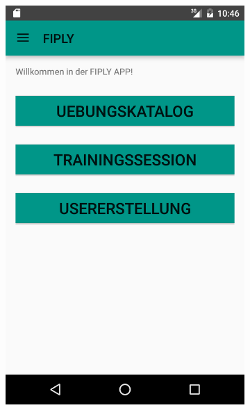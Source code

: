 \documentclass[FIPLY_base.tex]{subfiles}
\begin{document}
\begin{figure}[t]
\begin{subfigure}[h]{0.3\textwidth}
	\end{subfigure}
	\hfil
	\begin{subfigure}[h]{0.3\textwidth}
	\includegraphics[scale=0.20]{img/MFragment}
	\end{subfigure}	
	\caption{Bild des NavigationDrawers und des FMains} 
	\ \\
	\begin{subfigure}[h]{0.3\textwidth}

\end{subfigure}
\end{figure}
\end{document}
